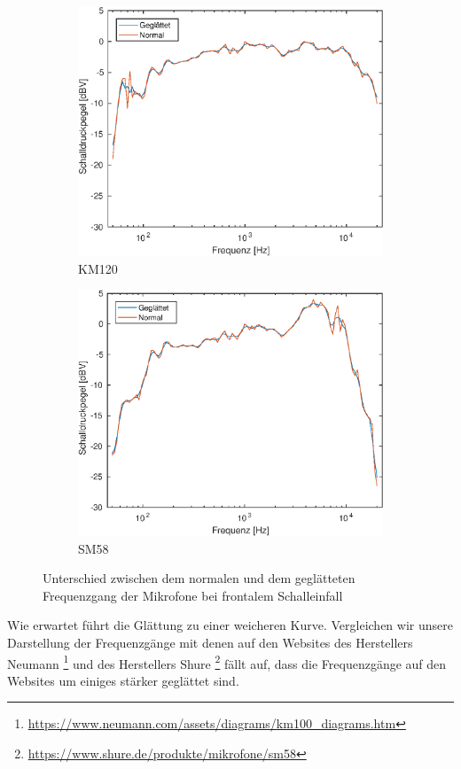 \begin{figure}[bth]
    \centering
    \begin{subfigure}{.5\textwidth}
        \centering
        \caption{KM120}
        \includegraphics[width=0.95\linewidth]{Figures/km120_0_movmean}
    \end{subfigure}%
    \begin{subfigure}{.5\textwidth}
        \centering
        \caption{SM58}
        \includegraphics[width=0.95\linewidth]{Figures/sm58_0_movmean}
    \end{subfigure}
    \caption{Unterschied zwischen dem normalen und dem geglätteten Frequenzgang der Mikrofone bei frontalem Schalleinfall}
    \label{fig:freq_movmean}
\end{figure}
Wie erwartet führt die Glättung zu einer weicheren Kurve. 
Vergleichen wir unsere Darstellung der Frequenzgänge mit denen auf den Websites des Herstellers Neumann \footnote{\url{https://www.neumann.com/assets/diagrams/km100_diagrams.htm}} und des Herstellers Shure \footnote{\url{https://www.shure.de/produkte/mikrofone/sm58}} fällt auf, dass die Frequenzgänge auf den Websites  um einiges stärker geglättet sind.

